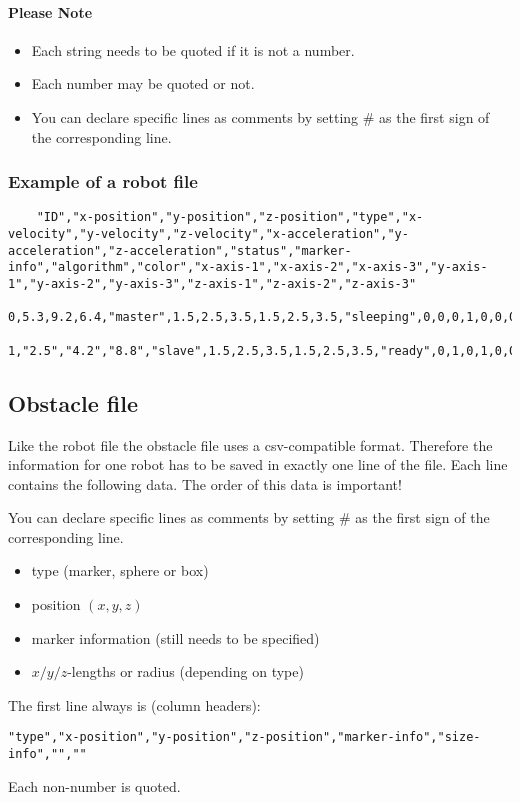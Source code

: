 \paragraph{Please Note}
\begin{itemize}
	\item Each string needs to be quoted if it is not a number.
	\item Each number may be quoted or not.
	\item You can declare specific lines as comments by setting \# as the first sign of the corresponding line.
\end{itemize}


\subsubsection{Example of a robot file}
\begin{lstlisting}
	"ID","x-position","y-position","z-position","type","x-velocity","y-velocity","z-velocity","x-acceleration","y-acceleration","z-acceleration","status","marker-info","algorithm","color","x-axis-1","x-axis-2","x-axis-3","y-axis-1","y-axis-2","y-axis-3","z-axis-1","z-axis-2","z-axis-3"
	0,5.3,9.2,6.4,"master",1.5,2.5,3.5,1.5,2.5,3.5,"sleeping",0,0,0,1,0,0,0,1,0,0,0,1
	1,"2.5","4.2","8.8","slave",1.5,2.5,3.5,1.5,2.5,3.5,"ready",0,1,0,1,0,0,0,1,0,0,0,1
\end{lstlisting}

\subsection{Obstacle file}
Like the robot file the obstacle file uses a csv-compatible format. 
Therefore the information for one robot has to be saved in exactly one line of the file.
Each line contains the following data. The order of this data is important!

You can declare specific lines as comments by setting \# as the first sign of
the corresponding line.
\begin{itemize}
	\item type (marker, sphere or box)
	\item position $(x,y,z)$
	\item marker information (still needs to be specified)
	\item $x/y/z$-lengths or radius (depending on type)
\end{itemize}

The first line always is (column headers):
\begin{lstlisting}
"type","x-position","y-position","z-position","marker-info","size-info","",""
\end{lstlisting}
Each non-number is quoted.


